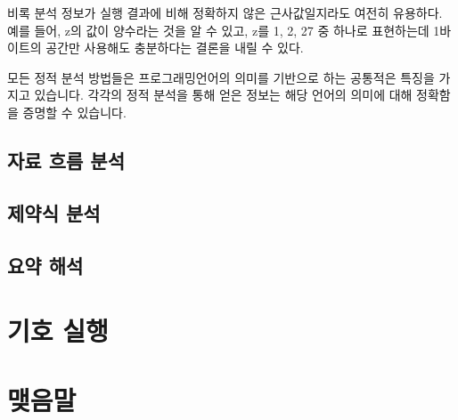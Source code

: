\documentclass[a4paper]{book}
\begin{document}
비록 분석 정보가 실행 결과에 비해 정확하지 않은 근사값일지라도 여전히
유용하다.  예를 들어, z의 값이 양수라는 것을 알 수 있고, z를 1, 2, 27
중 하나로 표현하는데 1바이트의 공간만 사용해도 충분하다는 결론을 내릴
수 있다.

모든 정적 분석 방법들은 프로그래밍언어의 의미를 기반으로 하는 공통적은
특징을 가지고 있습니다. 각각의 정적 분석을 통해 얻은 정보는 해당
언어의 의미에 대해 정확함을 증명할 수 있습니다.

\section{자료 흐름 분석}



\section{제약식 분석}

\section{요약 해석}

\chapter{기호 실행}

\chapter{맺음말}




\end{document}
